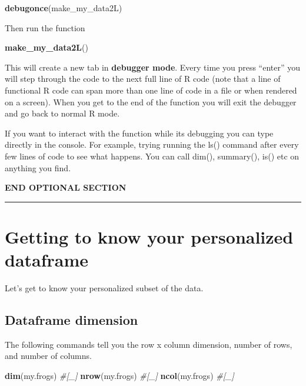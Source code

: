 \documentclass[]{book}
\newenvironment{Shaded}{\begin{snugshade}}{\end{snugshade}}
\newcommand{\KeywordTok}[1]{\textcolor[rgb]{0.13,0.29,0.53}{\textbf{#1}}}
\newcommand{\CommentTok}[1]{\textcolor[rgb]{0.56,0.35,0.01}{\textit{#1}}}
\newcommand{\NormalTok}[1]{#1}
\theoremstyle{definition}
\theoremstyle{definition}
\theoremstyle{definition}
\theoremstyle{remark}
\begin{document}
\begin{Shaded}
\begin{Highlighting}[]
\KeywordTok{debugonce}\NormalTok{(make_my_data2L)}
\end{Highlighting}
\end{Shaded}

Then run the function

\begin{Shaded}
\begin{Highlighting}[]
\KeywordTok{make_my_data2L}\NormalTok{()}
\end{Highlighting}
\end{Shaded}

This will create a new tab in \textbf{debugger mode}. Every time you
press ``enter'' you will step through the code to the next full line of
R code (note that a line of functional R code can span more than one
line of code in a file or when rendered on a screen). When you get to
the end of the function you will exit the debugger and go back to normal
R mode.

If you want to interact with the function while its debugging you can
type directly in the console. For example, trying running the ls()
command after every few lines of code to see what happens. You can call
dim(), summary(), is() etc on anything you find.

\textbf{END OPTIONAL SECTION}

\begin{center}\rule{0.5\linewidth}{\linethickness}\end{center}

\section{Getting to know your personalized
dataframe}\label{getting-to-know-your-personalized-dataframe}

Let's get to know your personalized subset of the data.

\subsection{Dataframe dimension}\label{dataframe-dimension}

The following commands tell you the row x column dimension, number of
rows, and number of columns.

\begin{Shaded}
\begin{Highlighting}[]
\KeywordTok{dim}\NormalTok{(my.frogs)  }\CommentTok{#[_]}
\KeywordTok{nrow}\NormalTok{(my.frogs) }\CommentTok{#[_]}
\KeywordTok{ncol}\NormalTok{(my.frogs) }\CommentTok{#[_]}
\end{Highlighting}
\end{Shaded}
\end{document}
